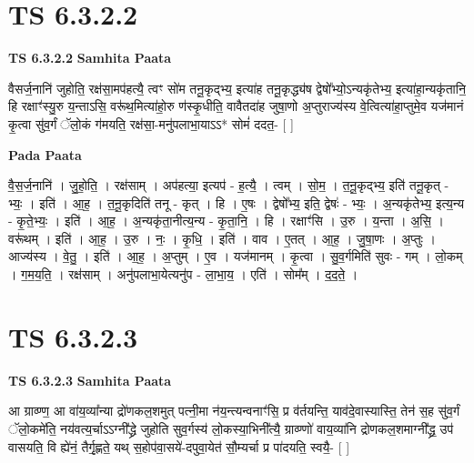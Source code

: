 \documentclass[17pt]{extarticle}
\begin{document}
\section*{ TS 6.3.2.2 }

\textbf{TS 6.3.2.2 } \newline
\textbf{Samhita Paata} \newline

वैसर्ज॒नानि॑ जुहोति॒ रक्ष॑सा॒मप॑हत्यै॒ त्वꣳ सो॑म तनू॒कृद्भ्य॒ इत्या॑ह तनू॒कृद्ध्य॑ष द्वेषो᳚भ्यो॒ऽन्यकृ॑तेभ्य॒ इत्या॑हा॒न्यकृ॑तानि॒ हि रक्षाꣳ॑स्यु॒रु य॒न्ताऽसि॒ वरू॑थ॒मित्या॑हो॒रु ण॑स्कृ॒धीति॒ वावैतदा॑ह जुषा॒णो अ॒प्तुराज्य॑स्य वे॒त्वित्या॑हा॒प्तुमे॒व यज॑मानं कृ॒त्वा सु॑व॒र्गं ॅलो॒कं ग॑मयति॒ रक्ष॑सा॒-मनु॑पलाभा॒याऽऽ* सोमं॑ ददत॒- [  ] \newline

\textbf{Pada Paata} \newline

वै॒स॒र्ज॒नानि॑ । जु॒हो॒ति॒ । रक्ष॑साम् । अप॑हत्या॒ इत्यप॑ - ह॒त्यै॒ । त्वम् । सो॒म॒ । त॒नू॒कृद्भ्य॒ इति॑ तनू॒कृत् - भ्यः॒ । इति॑ । आ॒ह॒ । त॒नू॒कृदिति॑ तनू - कृत् । हि । ए॒षः । द्वेषो᳚भ्य॒ इति॒ द्वेषः॑ - भ्यः॒ । अ॒न्यकृ॑तेभ्य॒ इत्य॒न्य - कृ॒ते॒भ्यः॒ । इति॑ । आ॒ह॒ । अ॒न्यकृ॑ता॒नीत्य॒न्य - कृ॒ता॒नि॒ । हि । रक्षाꣳ॑सि । उ॒रु । य॒न्ता । अ॒सि॒ । वरू॑थम् । इति॑ । आ॒ह॒ । उ॒रु । नः॒ । कृ॒धि॒ । इति॑ । वाव । ए॒तत् । आ॒ह॒ । जु॒षा॒णः । अ॒प्तुः । आज्य॑स्य । वे॒तु॒ । इति॑ । आ॒ह॒ । अ॒प्तुम् । ए॒व । यज॑मानम् । कृ॒त्वा । सु॒व॒र्गमिति॑ सुवः - गम् । लो॒कम् । ग॒म॒य॒ति॒ । रक्ष॑साम् । अनु॑पलाभा॒येत्यनु॑प - ला॒भा॒य॒ । एति॑ । सोम᳚म् । द॒द॒ते॒ ।  \newline




\section*{ TS 6.3.2.3 }

\textbf{TS 6.3.2.3 } \newline
\textbf{Samhita Paata} \newline

आ ग्राव्ण्ण॒ आ वा॑य॒व्या᳚न्या द्रो॑णकल॒शमुत् पत्नी॒मा न॑य॒न्त्यन्वनाꣳ॑सि॒ प्र व॑र्तयन्ति॒ याव॑दे॒वास्यास्ति॒ तेन॑ स॒ह सु॑व॒र्गं ॅलो॒कमे॑ति॒ नय॑वत्य॒र्चाऽऽग्नी᳚द्ध्रे जुहोति सुव॒र्गस्य॑ लो॒कस्या॒भिनी᳚त्यै॒ ग्राव्ण्णो॑ वाय॒व्या॑नि द्रोणकल॒शमाग्नी᳚द्ध्र॒ उप॑ वासयति॒ वि ह्ये॑नं॒ तैर्गृ॒ह्णते॒ यथ् स॒होप॑वा॒सये॑-दपुवा॒येत॑ सौ॒म्यर्चा प्र पा॑दयति॒ स्वयै॒- [  ] \newline
\end{document}
